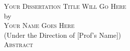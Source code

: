 \documentclass[12pt, notitlepage ]{report}
\begin{document}

\newcommand{\doctitle}{Your Dissertation Title Will Go Here}
\newcommand{\docauthor}{Your Name Goes Here}



\newpage
\thispagestyle{empty}
\vspace*{18pt}
\begin{center}
  \textsc{\large{\doctitle}}\\[18pt]  %
  by\\[18pt]
  \textsc{\docauthor}\\[12pt]
  (Under the Direction of [Prof's Name])\\[12pt]
  \textsc{Abstract}
\end{center}


\thispagestyle{empty}

\begin{list}{\textsc{Index words:\hfill}}{\leftmargin 1.4in}
  \item
  \begin{flushleft}
  \end{flushleft}
\end{list}


\newpage




\newpage



\newpage












\end{document}
